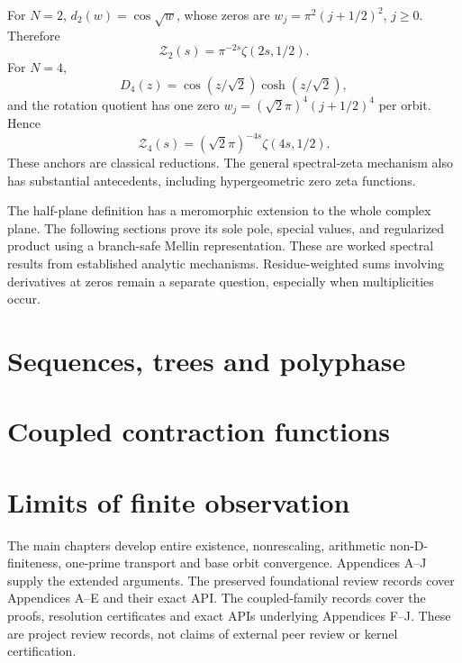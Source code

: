 \documentclass[11pt,oneside,openany]{book}
\begin{document}
For $N=2$, $d_2(w)=\cos\sqrt w$, whose zeros are
$w_j=\pi^2(j+1/2)^2$, $j\ge0$. Therefore
\[
\mathcal Z_2(s)=\pi^{-2s}\zeta(2s,1/2).
\]
For $N=4$,
\[
D_4(z)=\cos(z/\sqrt2)\cosh(z/\sqrt2),
\]
and the rotation quotient has one zero
$w_j=(\sqrt2\pi)^4(j+1/2)^4$ per orbit. Hence
\[
\mathcal Z_4(s)=(\sqrt2\pi)^{-4s}\zeta(4s,1/2).
\]
These anchors are classical reductions. The general spectral-zeta mechanism
also has substantial antecedents, including hypergeometric zero zeta functions.

The half-plane definition has a meromorphic extension to the
whole complex plane. The following sections prove its sole pole, special values,
and regularized product using a branch-safe Mellin representation.
These are worked spectral results from established analytic mechanisms.
Residue-weighted sums involving derivatives at zeros remain a separate
question, especially when multiplicities occur.


\chapter{Sequences, trees and polyphase}\label{ch:sequences}



\chapter{Coupled contraction functions}\label{ch:coupled}


\chapter{Limits of finite observation}\label{ch:resolution}


\clearpage
\clearpage
\clearpage
\clearpage
\clearpage

\backmatter
{}\label{evidence}
The main chapters develop entire existence, nonrescaling, arithmetic
non-D-finiteness, one-prime transport and base orbit convergence.
Appendices A--J supply the extended arguments. The preserved foundational
review records cover Appendices A--E and their exact API. The coupled-family
records cover the proofs, resolution certificates and exact APIs underlying
Appendices F--J. These are project review records, not claims of external
peer review or kernel certification.
\end{document}
